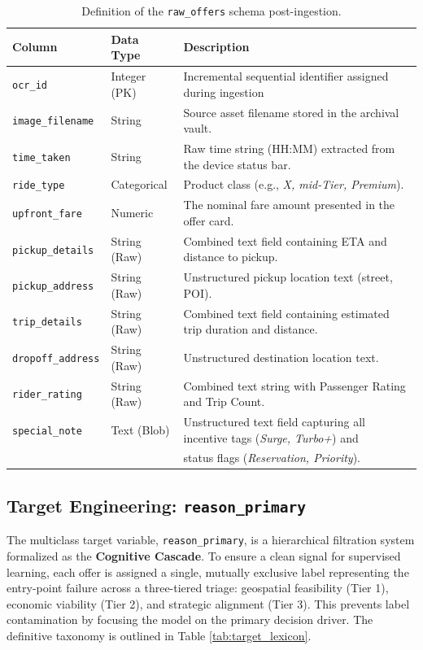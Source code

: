 \begin{table}[H]
    \centering
    \small
    \begin{tabular}{l l l}
        \toprule
        \textbf{Column} & \textbf{Data Type} & \textbf{Description} \\
        \midrule
        \texttt{ocr\_id} & Integer (PK) & Incremental sequential identifier assigned during ingestion \\
        \texttt{image\_filename} & String & Source asset filename stored in the archival vault. \\
        \texttt{time\_taken} & String & Raw time string (HH:MM) extracted from the device status bar. \\
        \texttt{ride\_type} & Categorical & Product class (e.g., \textit{X, mid-Tier, Premium}). \\
        \texttt{upfront\_fare} & Numeric & The nominal fare amount presented in the offer card. \\
        \texttt{pickup\_details} & String (Raw) & Combined text field containing ETA and distance to pickup. \\
        \texttt{pickup\_address} & String (Raw) & Unstructured pickup location text (street, POI). \\
        \texttt{trip\_details} & String (Raw) & Combined text field containing estimated trip duration and distance. \\
        \texttt{dropoff\_address} & String (Raw) & Unstructured destination location text. \\
        \texttt{rider\_rating} & String (Raw) & Combined text string with Passenger Rating and Trip Count. \\
        \texttt{special\_note} & Text (Blob) & Unstructured text field capturing all incentive tags (\textit{Surge, Turbo+}) and \\ 
        & & status flags (\textit{Reservation, Priority}). \\
        \bottomrule
    \end{tabular}
    \caption{Definition of the \texttt{raw\_offers} schema post-ingestion.}
    \label{tab:raw_schema}
\end{table}


\subsection{Target Engineering: \texttt{reason\_primary}}
The multiclass target variable, \texttt{reason\_primary}, is a hierarchical filtration system formalized as the \textbf{Cognitive Cascade}. To ensure a clean signal for supervised learning, each offer is assigned a single, mutually exclusive label representing the entry-point failure across a three-tiered triage: geospatial feasibility (Tier 1), economic viability (Tier 2), and strategic alignment (Tier 3). This prevents label contamination by focusing the model on the primary decision driver. The definitive taxonomy is outlined in Table \ref{tab:target_lexicon}.

